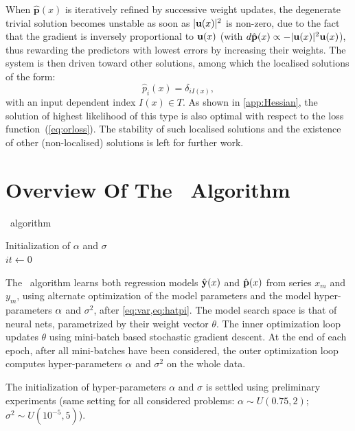 When $\hat{\mathbf{p}}(x)$ is iteratively refined by successive weight updates, the degenerate 
trivial solution becomes unstable as soon as $\vert {\bf u}(x)\vert^2$ is non-zero, due to the fact 
that the gradient is inversely proportional to ${\bf u}(x)$ (with 
$d\hat{\bf p}(x)\propto -\vert {\bf u}(x)\vert^2 {\bf u}(x)$), thus rewarding the predictors with lowest 
errors by increasing their weights. The system is then driven toward other solutions, among which 
the localised solutions of the form:
% 
\[
  \hat p_i(x) = \delta_{iI(x)},
\]
%
with an input dependent index $I(x)\in T$. As shown in \cref{app:Hessian}, the solution of highest 
likelihood of this type is also optimal with respect to the loss function~(\cref{eq:orloss}). The 
stability of such localised solutions and the existence of other (non-localised) solutions is left 
for further work.  


\section{Overview Of The \XX\ Algorithm}\label{sec:model}
\begin{algorithm}[H]
  \SetAlgoLined
   \caption{\XX\ algorithm}
   Initialization of $\alpha$ and $\sigma$\\
   $it \longleftarrow 0$ \;
\end{algorithm}
The \XX\ algorithm learns both regression models $\hat {\bf y}(x)$ and $\hat {\bf p}(x)$ from 
series $x_m$ and $y_m$, using alternate optimization of the model parameters and the model 
hyper-parameters ${\bf \alpha}$ and $\sigma^2$, after \cref{eq:var,eq:hatpi}. 
The model search space is that of neural nets, parametrized by their weight vector $\theta$. 
The inner optimization loop updates $\theta$ using mini-batch based stochastic gradient descent. 
At the end of each epoch, after all mini-batches have been considered, the outer optimization loop 
computes hyper-parameters ${\bf \alpha}$ and $\sigma^2$ on the whole data. 
 
The initialization of hyper-parameters $\alpha$ and $\sigma$ is settled using preliminary 
experiments (same setting for all considered problems: 
$\alpha \sim U(0.75, 2)$; $\sigma^2 \sim U(10^{-5}, 5)$).

